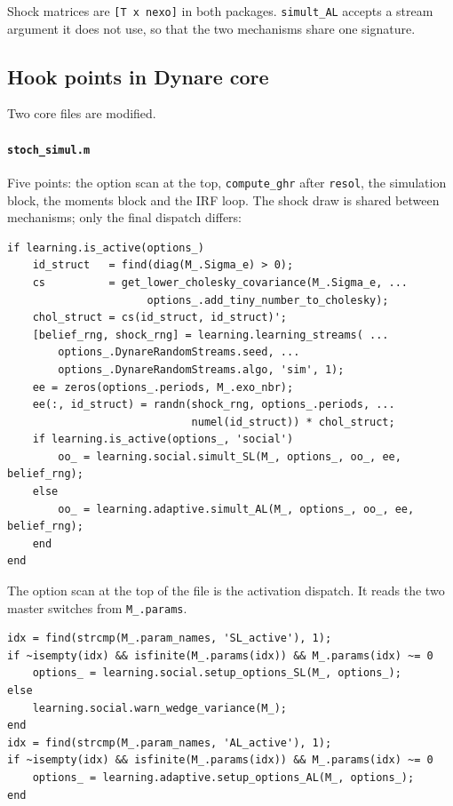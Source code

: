 \documentclass[11pt,a4paper]{article}
\newcommand{\field}[1]{\texttt{#1}}
\newcommand{\file}[1]{\texttt{#1}}
\begin{document}
Shock matrices are \texttt{[T x nexo]} in both packages. \texttt{simult\_AL}
accepts a stream argument it does not use, so that the two mechanisms share one
signature.


\subsection{Hook points in Dynare core}
\label{app:architecture:hooks}

Two core files are modified.

\paragraph{\file{stoch\_simul.m}} Five points: the option scan at the top,
\texttt{compute\_ghr} after \texttt{resol}, the simulation block, the moments
block and the IRF loop. The shock draw is shared between mechanisms; only the
final dispatch differs:

\begin{lstlisting}[style=matlab]
if learning.is_active(options_)
    id_struct   = find(diag(M_.Sigma_e) > 0);
    cs          = get_lower_cholesky_covariance(M_.Sigma_e, ...
                      options_.add_tiny_number_to_cholesky);
    chol_struct = cs(id_struct, id_struct)';
    [belief_rng, shock_rng] = learning.learning_streams( ...
        options_.DynareRandomStreams.seed, ...
        options_.DynareRandomStreams.algo, 'sim', 1);
    ee = zeros(options_.periods, M_.exo_nbr);
    ee(:, id_struct) = randn(shock_rng, options_.periods, ...
                             numel(id_struct)) * chol_struct;
    if learning.is_active(options_, 'social')
        oo_ = learning.social.simult_SL(M_, options_, oo_, ee, belief_rng);
    else
        oo_ = learning.adaptive.simult_AL(M_, options_, oo_, ee, belief_rng);
    end
end
\end{lstlisting}

\noindent
The option scan at the top of the file is the activation dispatch. It reads the
two master switches from \field{M\_.params}.

\begin{lstlisting}[style=matlab]
idx = find(strcmp(M_.param_names, 'SL_active'), 1);
if ~isempty(idx) && isfinite(M_.params(idx)) && M_.params(idx) ~= 0
    options_ = learning.social.setup_options_SL(M_, options_);
else
    learning.social.warn_wedge_variance(M_);
end
idx = find(strcmp(M_.param_names, 'AL_active'), 1);
if ~isempty(idx) && isfinite(M_.params(idx)) && M_.params(idx) ~= 0
    options_ = learning.adaptive.setup_options_AL(M_, options_);
end
\end{lstlisting}
\end{document}
